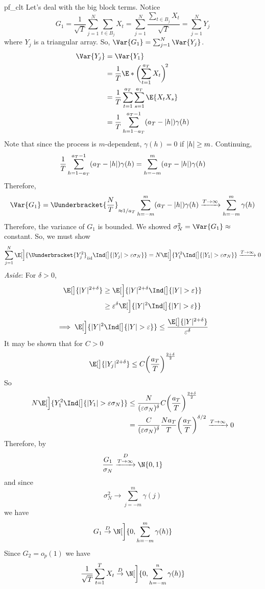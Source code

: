 \begin{Proof}{}{pf_clt}
    Let's deal with the big block terms. Notice
    \[ G_1=\frac{1}{\sqrt{T}}\sum_{j=1}^{N} \sum_{t\in B_j}X_t=
        \sum_{j=1}^{N}\frac{\sum_{t\in B_j} X_t}{\sqrt{T}}=\sum_{j=1}^{N}Y_j  \]
    where $ Y_{j} $ is a triangular array. So,
    $ \Var{G_1}=\sum_{j=1}^{N} \Var{Y_j} $.
    \begin{align*}
        \Var{Y_j}
         & =\Var{Y_1}                                                 \\
         & =\frac{1}{T} \E*{\biggl(\sum_{t=1}^{a_T}X_t\biggr)^{\!2}}  \\
         & =\frac{1}{T}\sum_{t=1}^{a_T} \sum_{s=1}^{a_T} \E{X_t X_s}  \\
         & =\frac{1}{T} \sum_{h=1-a_T}^{a_T-1} (a_T-\abs{h})\gamma(h)
    \end{align*}
    Note that since the process is $ m $-dependent, $ \gamma(h)=0 $ if $ \lvert h\rvert\ge m $.
    Continuing,
    \[ \frac{1}{T} \sum_{h=1-a_T}^{a_T-1} (a_T-\lvert h\rvert)\gamma(h)=
        \sum_{h=-m}^{m} (a_T-\lvert h\rvert)\gamma(h) \]
    Therefore,
    \[ \Var{G_1}=\Uunderbracket{\frac{N}{T}}_{\approx 1/a_T}
        \sum_{h=-m}^{m}(a_T-\abs{h})\gamma(h) \xrightarrow{T\to\infty} \sum_{h=-m}^{m} \gamma(h) \]
    Therefore, the variance of $ G_1 $ is bounded.
    We showed $ \sigma_N^2=\Var{G_1}\approx $ constant. So, we must show
    \[
        \sum_{j=1}^{N} \E[\Big]{\Uunderbracket{Y_{j}^2}_{\text{iid}} \Ind[\big]{\abs{Y_{j}}>\varepsilon\sigma_N}}=
        N\E[\Big]{Y_{1}^2 \Ind[\big]{\abs{Y_{1}}>\varepsilon\sigma_N}} \xrightarrow{T\to\infty}0
    \]
    \emph{Aside}: For $ \delta>0 $,
    \begin{align*}
        \E[\big]{\abs{Y}^{2+\delta}}
         & \ge \E[\Big]{\abs{Y}^{2+\delta}\Ind[\big]{\abs{Y}>\varepsilon}}           \\
         & \ge \varepsilon^\delta\E[\Big]{\abs{Y}^2 \Ind[\big]{\abs{Y}>\varepsilon}}
    \end{align*}
    \[ \implies \E[\Big]{\abs{Y}^2 \Ind[\big]{\abs{Y}>\varepsilon}}\le \frac{\E[\big]{\abs{Y}^{2+\delta}}}{\varepsilon^\delta} \]
    It may be shown that for $ C>0 $
    \[ \E[\big]{\abs{Y_j}^{2+\delta}}\le C\biggl(\frac{a_T}{T} \biggr)^{\frac{2+\delta}{2}} \]
    So
    \begin{align*}
        N\E[\Big]{Y_{1}^2 \Ind[\big]{\abs{Y_{1}}>\varepsilon\sigma_N}}
         & \le \frac{N}{(\varepsilon\sigma_N)^\delta}C\biggl(\frac{a_T}{T} \biggr)^{\frac{2+\delta}{2}} \\
         & =\frac{C}{(\varepsilon\sigma_N)^\delta}
        \frac{N a_T}{T}\biggl(\frac{a_T}{T} \biggr)^{\delta/2}\xrightarrow{T\to\infty}0
    \end{align*}
    Therefore, by~
    \[ \frac{G_1}{\sigma_N}\stackrel{D}{\xrightarrow{T\to\infty}}\N{0,1}  \]
    and since
    \[ \sigma_N^2\to \sum_{j=-m}^{m} \gamma(j) \]
    we have
    \[ G_1\stackrel{D}{\to}\N[\bigg]{0,\sum_{h=-m}^{m} \gamma(h)} \]
    Since $ G_2=o_p(1) $ we have
    \[ \frac{1}{\sqrt{T}}\sum_{t=1}^{T} X_t\stackrel{D}{\to}\N[\bigg]{0,\sum_{h=-m}^{n} \gamma(h)}  \]
\end{Proof}
